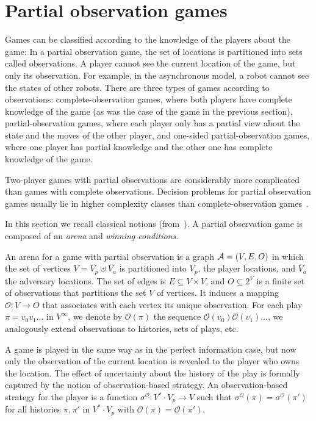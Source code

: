\section {Partial observation games}		
Games can be classified according to the knowledge of the players about the game:  
In a partial observation game, the set of locations is partitioned into sets called observations. 
A player cannot see the current location of the game, but only its observation.
For example, in the asynchronous model, a robot cannot see the states of other robots.
There are three types of games according to observations:  
 complete-observation games, where both players have complete knowledge of the game
(as was the case of the game in the previous section), partial-observation games, where 
each player only has a partial view about the state 
and the moves of the other player, and one-sided partial-observation games, where one player has partial knowledge 
and the other one has complete knowledge of the game.
 
 Two-player games with partial observations are considerably more complicated than games with complete observations.
 Decision problems for partial observation games usually lie in higher complexity classes than 
complete-observation games~\cite{Reif1984274}.


\bigskip
In this section we recall classical notions (from~\cite{doyen+raskin}). 
A partial observation game is composed of an \emph{arena} and \emph{winning conditions}.

An arena for a game with partial observation is a graph $\mathcal{A} = ( V, E, O)$ in which the set of vertices
$V=V_p\uplus V_a$ is partitioned into $V_p$, the player locations, and $V_a$
the adversary locations.  
The set of edges is $E\subseteq V\times V$, 
and $O \subseteq 2^{V}$ is a finite set of observations that partitions the set  $V$ of vertices. 
It induces a mapping $\mathcal{O}:  V \to O$ that associates with each vertex its unique observation.
For each play $\pi = v_0v_1\dots$ in $V^\infty$, we denote by $\mathcal{O}(\pi)$ the sequence $\mathcal{O}(v_0)\mathcal{O}(v_1)\dots$, 
we analogously extend observations to histories, sets of plays, etc.

A game is played in the same way as in the perfect information case, but now only the observation 
of the current location is revealed to the player who owns the location. The effect of uncertainty 
about the history of the play is formally captured by the notion of observation-based strategy.
An observation-based strategy for the player is a function $\sigma^\mathcal{O}:  V^*\cdot V_p \rightarrow V$ 
such that $\sigma^\mathcal{O}(\pi) = \sigma^\mathcal{O}(\pi')$ for all histories $\pi, \pi' $ in $V^*\cdot V_p$ with 
$\mathcal{O}(\pi) = \mathcal{O}(\pi')$.

